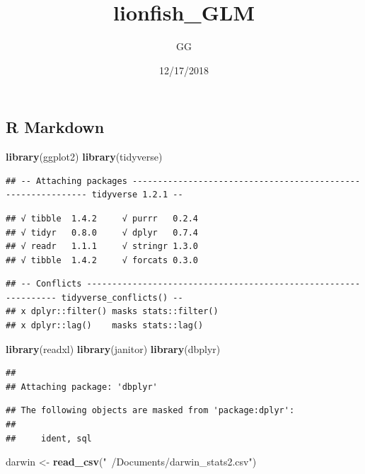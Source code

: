 \documentclass[]{article}
\title{lionfish\_GLM}
\author{GG}
\date{12/17/2018}
\newenvironment{Shaded}{\begin{snugshade}}{\end{snugshade}}
\newcommand{\KeywordTok}[1]{\textcolor[rgb]{0.13,0.29,0.53}{\textbf{#1}}}
\newcommand{\StringTok}[1]{\textcolor[rgb]{0.31,0.60,0.02}{#1}}
\newcommand{\NormalTok}[1]{#1}
\begin{document}
\maketitle

\subsection{R Markdown}\label{r-markdown}

\begin{Shaded}
\begin{Highlighting}[]
\KeywordTok{library}\NormalTok{(ggplot2)}
\KeywordTok{library}\NormalTok{(tidyverse)}
\end{Highlighting}
\end{Shaded}

\begin{verbatim}
## -- Attaching packages ------------------------------------------------------------- tidyverse 1.2.1 --
\end{verbatim}

\begin{verbatim}
## √ tibble  1.4.2     √ purrr   0.2.4
## √ tidyr   0.8.0     √ dplyr   0.7.4
## √ readr   1.1.1     √ stringr 1.3.0
## √ tibble  1.4.2     √ forcats 0.3.0
\end{verbatim}

\begin{verbatim}
## -- Conflicts ---------------------------------------------------------------- tidyverse_conflicts() --
## x dplyr::filter() masks stats::filter()
## x dplyr::lag()    masks stats::lag()
\end{verbatim}

\begin{Shaded}
\begin{Highlighting}[]
\KeywordTok{library}\NormalTok{(readxl)}
\KeywordTok{library}\NormalTok{(janitor)}
\KeywordTok{library}\NormalTok{(dbplyr)}
\end{Highlighting}
\end{Shaded}

\begin{verbatim}
## 
## Attaching package: 'dbplyr'
\end{verbatim}

\begin{verbatim}
## The following objects are masked from 'package:dplyr':
## 
##     ident, sql
\end{verbatim}

\begin{Shaded}
\begin{Highlighting}[]
\NormalTok{darwin <-}\StringTok{ }\KeywordTok{read_csv}\NormalTok{(}\StringTok{"~/Documents/darwin_stats2.csv"}\NormalTok{)}
\end{Highlighting}
\end{Shaded}
\end{document}
